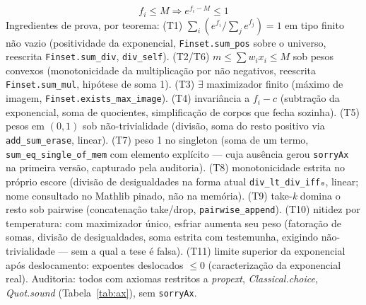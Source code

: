\begin{equation*}
f_i\leq M\Rightarrow e^{f_i-M}\leq1 \tag{T11}
\end{equation*}
Ingredientes de prova, por teorema: (T1) $\sum_i(e^{f_i}/\sum_j e^{f_j})=1$ em tipo finito não vazio (positividade da exponencial, \texttt{Finset.sum\_pos} sobre o universo, reescrita \texttt{Finset.sum\_div}, \texttt{div\_self}). (T2/T6) $m\leq\sum w_ix_i\leq M$ sob pesos convexos (monotonicidade da multiplicação por não negativos, reescrita \texttt{Finset.sum\_mul}, hipótese de soma 1). (T3) $\exists$ maximizador finito (máximo de imagem, \nolinkurl{Finset.exists_max_image}). (T4) invariância a $f_i-c$ (subtração da exponencial, soma de quocientes, simplificação de corpos que fecha sozinha). (T5) pesos em $(0,1)$ sob não-trivialidade (divisão, soma do resto positivo via \texttt{add\_sum\_erase}, linear). (T7) peso 1 no singleton (soma de um termo, \texttt{sum\_eq\_single\_of\_mem} com elemento explícito --- cuja ausência gerou \texttt{sorryAx} na primeira versão, capturado pela auditoria). (T8) monotonicidade estrita no próprio escore (divisão de desigualdades na forma atual \texttt{div\_lt\_div\_iff₀}, linear; nome consultado no Mathlib pinado, não na memória). (T9) take-\textit{k} domina o resto sob pairwise (concatenação take/drop, \texttt{pairwise\_append}). (T10) nitidez por temperatura: com maximizador único, esfriar aumenta seu peso (fatoração de somas, divisão de desigualdades, soma estrita com testemunha, exigindo não-trivialidade --- sem a qual a tese é falsa). (T11) limite superior da exponencial após deslocamento: expoentes deslocados $\leq 0$ (caracterização da exponencial real). Auditoria: todos com axiomas restritos a \textit{propext}, \textit{Classical.choice}, \textit{Quot.sound} (Tabela~\ref{tab:ax}), sem \texttt{sorryAx}.
